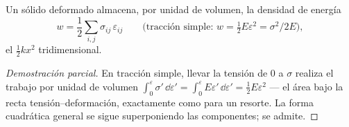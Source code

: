 \begin{proposition}\label{prop:b3:continuum-elasticity:energy}
Un sólido deformado almacena, por unidad de volumen, la densidad de energía
\[
w = \frac12\sum_{i,j}\sigma_{ij}\,\varepsilon_{ij}
\qquad\text{(tracción simple: } w = \tfrac12 E\varepsilon^2 =
\sigma^2/2E\text{)} ,
\]
el $\tfrac12 kx^2$ tridimensional.
\end{proposition}

\begin{proof}[Demostración parcial]
En tracción simple, llevar la tensión de $0$ a $\sigma$ realiza el trabajo
por unidad de volumen $\int_0^\varepsilon\sigma'\,\dd\varepsilon' =
\int_0^\varepsilon E\varepsilon'\,\dd\varepsilon' = \tfrac12
E\varepsilon^2$ --- el área bajo la recta tensión--deformación, exactamente
como para un resorte. La forma cuadrática general se sigue superponiendo las
componentes; se admite.
\end{proof}

